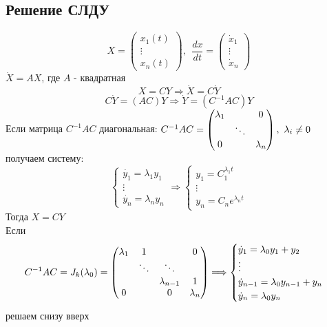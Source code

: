    \subsection{Решение СЛДУ}
    $$X = \begin{pmatrix}
        x_1(t)\\
        \vdots\\
        x_n(t)
    \end{pmatrix} , \ \ \frac{dx}{dt} = \begin{pmatrix}
        \dot{x}_1 \\
        \vdots\\
        \dot{x}_n
    \end{pmatrix}$$
    $\dot{X} = AX$, где $A$ - квадратная
    $$X = CY \Longrightarrow \dot{X} = C\dot{Y}$$
    $$C\dot{Y} = (AC)Y \Longrightarrow \dot{Y} = (C^{-1}AC)Y$$
    Если матрица $C^{-1}AC$ диагональная: $C^{-1}AC = \begin{pmatrix}
        \lambda_1 & \null & 0\\
        \null & \ddots & \\
        0 & \null & \lambda_n
    \end{pmatrix}, \ \lambda_i \neq 0$ получаем систему: 
    $$\begin{cases}
        \dot{y_1} = \lambda_1 y_1\\
        \vdots \\
        \dot{y_n} = \lambda_n y_n
    \end{cases} \Longrightarrow \begin{cases}
        y_1 = C_1^{\lambda_1t}\\
        \vdots \\
        y_n = C_ne^{\lambda_nt}
    \end{cases}$$
    Тогда $X = CY$\\
    Если $$C^{-1}AC = J_k(\lambda_0) = \begin{pmatrix}
        \lambda_1 & 1 & \null & 0 \\
        \null & \ddots & \ddots & \null \\
        \null & \null & \lambda_{n-1} & 1 \\
        0 & \null & 0 & \lambda_n
    \end{pmatrix} \Longrightarrow \begin{cases}
        \dot{y}_1 = \lambda_0y_1 + y_2\\
        \vdots \\
        \dot{y}_{n-1} = \lambda_0y_{n-1} + y_n\\
        \dot{y}_n = \lambda_0y_n
    \end{cases}$$
    решаем снизу вверх
